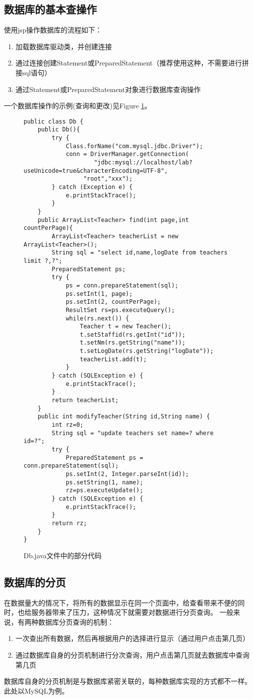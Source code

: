 \subsection{数据库的基本查操作}
使用jsp操作数据库的流程如下：
\begin{enumerate}
\item
加载数据库驱动类，并创建连接
\item
通过连接创建Statement或PreparedStatement（推荐使用这种，不需要进行拼接sql语句）
\item
通过Statement或PreparedStatement对象进行数据库查询操作
\end{enumerate}
一个数据库操作的示例(查询和更改)见Figure \ref{Log4j-db}。
\begin{figure}
\begin{verbatim}
public class Db {
	public Db(){
		try {
			Class.forName("com.mysql.jdbc.Driver");
			conn = DriverManager.getConnection(
			    	"jdbc:mysql://localhost/lab?useUnicode=true&characterEncoding=UTF-8",
				 "root","xxx");
		} catch (Exception e) {
			e.printStackTrace();
		}
	}
	public ArrayList<Teacher> find(int page,int countPerPage){
		ArrayList<Teacher> teacherList = new ArrayList<Teacher>();
		String sql = "select id,name,logDate from teachers limit ?,?";
		PreparedStatement ps;
		try {
			ps = conn.prepareStatement(sql);
			ps.setInt(1, page);
			ps.setInt(2, countPerPage);
			ResultSet rs=ps.executeQuery();
			while(rs.next()) {
				Teacher t = new Teacher();
				t.setStaffid(rs.getInt("id"));
				t.setNm(rs.getString("name"));
				t.setLogDate(rs.getString("logDate"));
				teacherList.add(t);
			}
		} catch (SQLException e) {
			e.printStackTrace();
		}
		return teacherList;
	}
	public int modifyTeacher(String id,String name) {
		int rz=0;
		String sql = "update teachers set name=? where id=?";
		try {
			PreparedStatement ps = conn.prepareStatement(sql);
			ps.setInt(2, Integer.parseInt(id));
			ps.setString(1, name);
			rz=ps.executeUpdate();
		} catch (SQLException e) {
			e.printStackTrace();
		}
		return rz;
	}
}
\end{verbatim}
\caption{Db.java文件中的部分代码}
\label{Log4j-db}
\end{figure}
\subsection{数据库的分页}
在数据量大的情况下，将所有的数据显示在同一个页面中，给查看带来不便的同时，也给服务器带来了压力，这种情况下就需要对数据进行分页查询。
一般来说，有两种数据库分页查询的机制：
\begin{enumerate}
\item
一次查出所有数据，然后再根据用户的选择进行显示（通过用户点击第几页）


\item
通过数据库自身的分页机制进行分次查询，用户点击第几页就去数据库中查询第几页

\end{enumerate}
数据库自身的分页机制是与数据库紧密关联的，每种数据库实现的方式都不一样。此处以MySQL为例。

